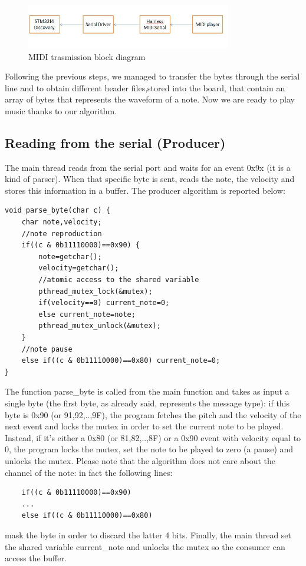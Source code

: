 \documentclass[12pt]{article}
\begin{document}
 \begin{figure}[H]
 	\includegraphics[width=0.8\textwidth]{Schema.jpg}
 	\caption{MIDI trasmission block diagram}
 	\label{fig:block}
 \end{figure}
Following the previous steps, we managed to transfer the bytes through the serial line and to obtain different header files,stored into the board, that contain an array of bytes that represents the waveform of a note. Now we are ready to play music thanks to our algorithm.

\subsection{Reading from the serial (Producer)}\label{subsec:reading}
The main thread reads from the serial port and waits for an event 0x9x (it is a kind of parser). When that specific byte is sent, reads the note, the velocity and stores this information in a buffer. The producer algorithm is reported below:
\begin{lstlisting}
void parse_byte(char c) {
	char note,velocity;
	//note reproduction
	if((c & 0b11110000)==0x90) {
		note=getchar();
		velocity=getchar();
		//atomic access to the shared variable
		pthread_mutex_lock(&mutex);
		if(velocity==0) current_note=0;
		else current_note=note;
		pthread_mutex_unlock(&mutex);
	}
	//note pause
	else if((c & 0b11110000)==0x80) current_note=0;
}
\end{lstlisting}
The function parse\_byte is called from the main function and takes as input a single byte (the first byte, as already said, represents the message type): if this byte is 0x90 (or 91,92,..,9F), the program fetches the pitch and the velocity of the next event and locks the mutex in order to set the current note to be played. Instead, if it's either a 0x80 (or 81,82,..,8F) or a 0x90 event with velocity equal to 0, the program locks the mutex, set the note to be played to zero (a pause) and unlocks the mutex. Please note that the algorithm does not care about the channel of the note: in fact the following lines:
\begin{lstlisting}
	if((c & 0b11110000)==0x90)
	...
	else if((c & 0b11110000)==0x80)
\end{lstlisting}
mask the byte in order to discard the latter 4 bits.\newline
Finally, the main thread set the shared variable current\_note and unlocks the mutex so the consumer can access the buffer.
\end{document}
